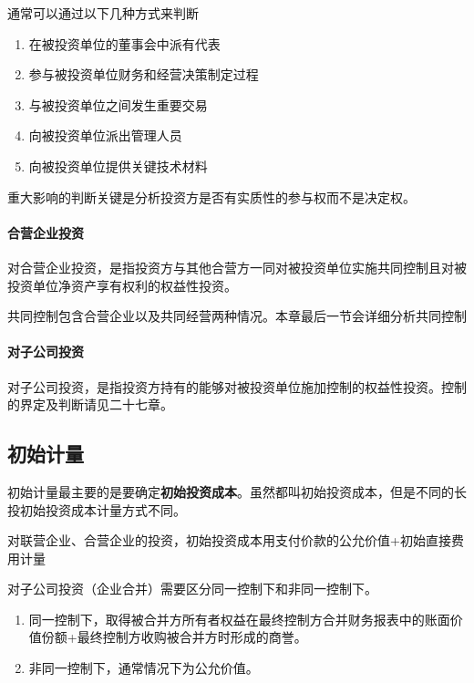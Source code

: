 \documentclass[UTF8,12pt]{ctexart}
\numberwithin{equation}{section} %
\numberwithin{figure}{section}
\numberwithin{table}{section}
\begin{document}
	通常可以通过以下几种方式来判断
	\begin{enumerate}
		\item 在被投资单位的董事会中派有代表
		
		\item 参与被投资单位财务和经营决策制定过程
		
		\item 与被投资单位之间发生重要交易
		
		\item 向被投资单位派出管理人员
		
		\item 向被投资单位提供关键技术材料
	\end{enumerate}
	
	重大影响的判断关键是分析投资方是否有实质性的参与权而不是决定权。
	
	\paragraph{合营企业投资}
	对合营企业投资，是指投资方与其他合营方一同对被投资单位实施共同控制且对被投资单位净资产享有权利的权益性投资。
	
	共同控制包含合营企业以及共同经营两种情况。本章最后一节会详细分析共同控制
	
	\paragraph{对子公司投资}
	对子公司投资，是指投资方持有的能够对被投资单位施加控制的权益性投资。控制的界定及判断请见二十七章。
	
	\subsection{初始计量}
	初始计量最主要的是要确定\textbf{初始投资成本}。虽然都叫初始投资成本，但是不同的长投初始投资成本计量方式不同。
	
	对联营企业、合营企业的投资，初始投资成本用支付价款的公允价值+初始直接费用计量
	
	对子公司投资（企业合并）需要区分同一控制下和非同一控制下。
	\begin{enumerate}
		\item 同一控制下，取得被合并方所有者权益在最终控制方合并财务报表中的账面价值份额+最终控制方收购被合并方时形成的商誉。
		
		\item 非同一控制下，通常情况下为公允价值。
	\end{enumerate}
	
\end{document}
